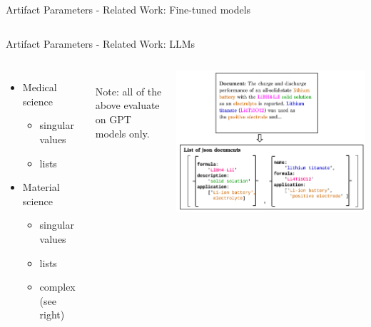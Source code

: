\documentclass[en,16:9,smallfoot]{sdqbeamer}
\begin{document}
\begin{frame}{Artifact Parameters - Related Work: Fine-tuned models}
\begin{columns}
   \end{columns}
   \end{frame}

   \begin{frame}{Artifact Parameters - Related Work: LLMs}
   \begin{columns}
           \begin{itemize}
               \item Medical science~\cite{Agrawal2022}
                   \begin{itemize}
                       \item singular values
                       \item lists
                   \end{itemize}
               \item Material science~\cite{Xie2023,Polak2023,Dunn2022}
                   \begin{itemize}
                       \item singular values
                       \item lists
                       \item complex~\cite{Dunn2022} (see right)
                   \end{itemize}
           \end{itemize}

          ‌\\
          Note: all of the above evaluate\\
          on GPT models only.
           \begin{center}\includegraphics[width=\textwidth]{imgs/llm_sciext}\end{center}
   \end{columns}
   \end{frame}
\end{document}
